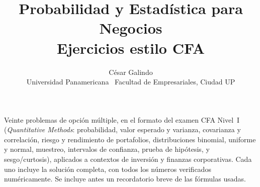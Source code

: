 \documentclass[11pt,a4paper,oneside]{article}
\title{\vspace{-1.5cm}\textbf{\Large Probabilidad y Estadística para Negocios}\\[2pt]\large Ejercicios estilo CFA}
\author{César Galindo\\ \small Universidad Panamericana \textperiodcentered\ Facultad de Empresariales, Ciudad UP}
\date{\small}
\theoremstyle{definition}
\begin{document}
\maketitle

\begin{ideaBox}
Veinte problemas de opción múltiple, en el formato del examen CFA Nivel~I
(\emph{Quantitative Methods}: probabilidad, valor esperado y varianza,
covarianza y correlación, riesgo y rendimiento de portafolios,
distribuciones binomial, uniforme y normal, muestreo, intervalos de
confianza, prueba de hipótesis, y sesgo/curtosis), aplicados a contextos de
inversión y finanzas corporativas. Cada uno incluye la solución completa,
con todos los números verificados numéricamente. Se incluye antes un
recordatorio breve de las fórmulas usadas.
\end{ideaBox}
\end{document}
